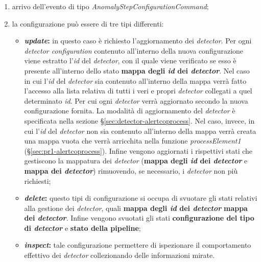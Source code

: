 \begin{enumerate}
	\item{arrivo dell'evento di tipo \textit{AnomalyStepConfigurationCommand};}
	\item{la configurazione può essere di tre tipi differenti:
	\begin{itemize}
		\item{\textbf{\textit{update}:} in questo caso è richiesto l'aggiornamento dei \textit{detector}. Per ogni \textit{detector configuration} contenuto all'interno della nuova configurazione viene estratto l'\textit{id} del \textit{detector}, con il quale viene verificato se esso è presente all'interno dello stato \textbf{mappa degli \textit{id} dei \textit{detector}}. Nel caso in cui l'\textit{id} del \textit{detector} sia contenuto all'interno della mappa verrà fatto l'accesso alla lista relativa di tutti i veri e propri \textit{detector} collegati a quel determinato \textit{id}. Per cui ogni \textit{detector} verrà aggiornato secondo la nuova configurazione fornita. La modalità di aggiornamento del \textit{detector} è specificata nella sezione \S\ref{sec:detector-alertcoprocess}. Nel caso, invece, in cui l'\textit{id} del \textit{detector} non sia contenuto all'interno della mappa verrà creata una mappa vuota che verrà arricchita nella funzione \textit{processElement1} (\S\ref{sec:pr1-alertcoprocess}). Infine vengono aggiornati i rispettivi stati che gestiscono la mappatura dei \textit{detector} (\textbf{mappa degli \textit{id} dei \textit{detector}} e \textbf{mappa dei \textit{detector}}) rimuovendo, se necessario, i \textit{detector} non più richiesti;}
		\item{\textbf{\textit{delete}:} questo tipi di configurazione si occupa di svuotare gli stati relativi alla gestione dei \textit{detector}, quali \textbf{mappa degli \textit{id} dei \textit{detector}} \textbf{mappa dei \textit{detector}}. Infine vengono svuotati gli stati \textbf{configurazione del tipo di \textit{detector}} e \textbf{stato della \gls{pipeline}};}
		\item{\textbf{\textit{inspect}:} tale configurazione permettere di ispezionare il comportamento effettivo dei \textit{detector} collezionando delle informazioni mirate.}
	\end{itemize}}
\end{enumerate}


